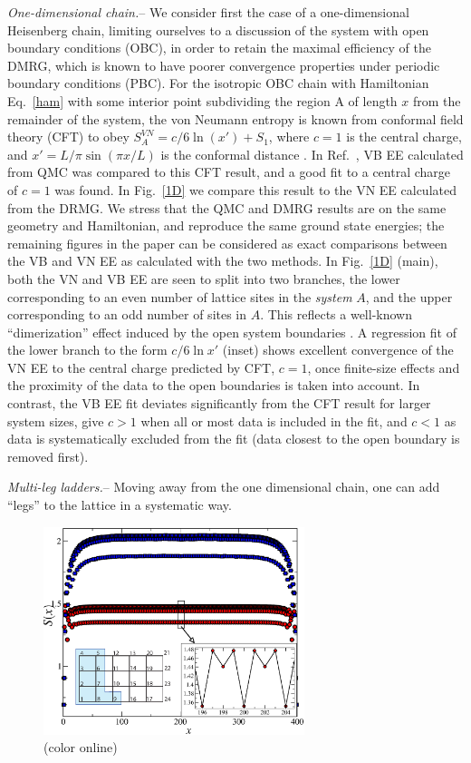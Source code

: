 \documentclass[prl,aps,twocolumn,floatfix,amsmath,amssymb,superscriptaddress,tightenlines]{revtex4}
\begin{document}
{\it One-dimensional chain.}-- We consider first the case of a one-dimensional Heisenberg chain, limiting ourselves to a discussion of the system with open boundary conditions (OBC), in order to retain the maximal efficiency of the DMRG, which is known to have poorer convergence properties under periodic boundary conditions (PBC).  For the isotropic OBC chain with Hamiltonian Eq.~\eqref{ham} with some interior point subdividing the region A of length $x$ from the remainder of the system, the von Neumann entropy is known from conformal field theory (CFT) to obey $S^{VN}_A = c/6 \ln(x') + S_1$, where $c=1$ is the central charge, and $x'=L/\pi \sin(\pi x / L)$ is the conformal distance \cite{Cardy}.
In Ref.~\cite{Alet}, VB EE calculated from QMC was compared to this CFT result, and a good fit to a central charge of $c=1$ was found.  In Fig.~\ref{1D} we compare this result to the VN EE calculated from the DRMG.  We stress that the QMC and DMRG results are on the same geometry and Hamiltonian, and reproduce the same ground state energies; the remaining figures in the paper can be considered as exact comparisons between the VB and VN EE as calculated with the two methods.  In Fig.~\ref{1D} (main), both the VN and VB EE are seen to split into two branches, the lower corresponding to an even number of lattice sites in the {\it system} $A$, and the upper corresponding to an odd number of sites in $A$.  This reflects a well-known ``dimerization'' effect induced by the open system boundaries \cite{Ian1}.  A regression fit of the lower branch to the form $c/6 \ln {x'}$ (inset) shows excellent convergence of the VN EE to the central charge predicted by CFT, $c=1$, once finite-size effects and the proximity of the data to the open boundaries is taken into account.  In contrast, the VB EE fit deviates significantly from the CFT result for larger system sizes, give $c>1$ when all or most data is included in the fit, and $c<1$ as data is systematically excluded from the fit (data closest to the open boundary is removed first).  

{\it Multi-leg ladders.}-- Moving away from the one dimensional chain, one can add ``legs'' to the lattice in a systematic way.
\begin{figure}
{
\includegraphics[width=3in]{FIG2.eps}
\caption{(color online) 
\label{ladder}}}
\end{figure}
\end{document}
